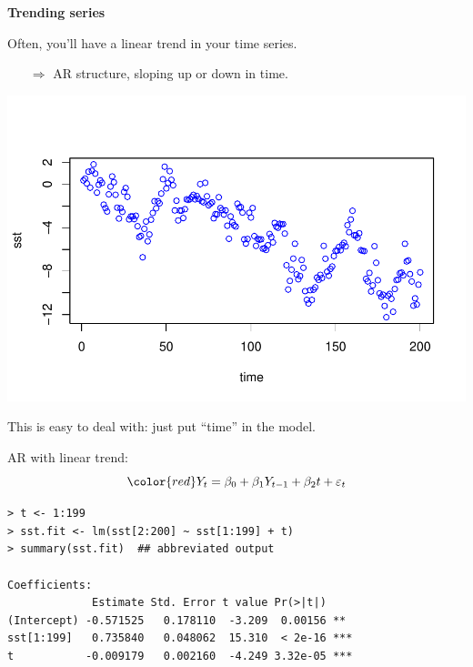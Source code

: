 \documentclass[12pt,xcolor=svgnames]{beamer}
\newcommand{\rd}{\color{red}}
\newcommand{\bl}{\color{blue}}
\newcommand{\theme}{\color{FireBrick}}
\newcommand{\sk}{\vspace{.4cm}}
\newcommand{\nochap}{\vspace{0.5cm}}
\newcommand{\chap}[1]{{\theme \Large \bf #1} \sk}
\begin{document}
\begin{frame}
\chap{Trending series}

Often, you'll have a linear trend in your time series.
\begin{itemize}
\item[$\Rightarrow$] AR structure, sloping up or down in time.
\end{itemize}

\begin{center}
\includegraphics[scale=0.6,trim=15 50 0 50]{artime}
\end{center}

\end{frame}

\begin{frame}[fragile]
\nochap

\vspace{-0.1cm}
This is easy to deal with: just put ``time'' in the model.

\vspace{0.25cm}
AR with linear trend:
\[
\rd Y_t =  \beta_0 + \beta_1Y_{t-1} +
\beta_2t + \varepsilon_t
\]

\vspace{-1cm}
{\bl \small
\begin{verbatim}
> t <- 1:199
> sst.fit <- lm(sst[2:200] ~ sst[1:199] + t)
> summary(sst.fit)  ## abbreviated output

Coefficients:
             Estimate Std. Error t value Pr(>|t|)    
(Intercept) -0.571525   0.178110  -3.209  0.00156 ** 
sst[1:199]   0.735840   0.048062  15.310  < 2e-16 ***
t           -0.009179   0.002160  -4.249 3.32e-05 ***
\end{verbatim}
}
\end{frame}
\end{document}
